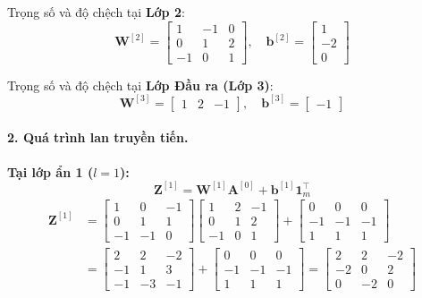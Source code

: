 Trọng số và độ chệch tại \textbf{Lớp 2}:
\begin{equation}
\mathbf{W}^{[2]} = 
\begin{bmatrix}
    1 & -1 & 0 \\
    0 & 1 & 2 \\
    -1 & 0 & 1
\end{bmatrix}, 
\quad
\mathbf{b}^{[2]} = 
\begin{bmatrix}
    1 \\ -2 \\ 0
\end{bmatrix}
\end{equation}

Trọng số và độ chệch tại \textbf{Lớp Đầu ra (Lớp 3)}:
\begin{equation}
\mathbf{W}^{[3]} = 
\begin{bmatrix}
    1 & 2 & -1
\end{bmatrix},
\quad
\mathbf{b}^{[3]} = 
\begin{bmatrix}
    -1
\end{bmatrix}
\end{equation}

\paragraph{2. Quá trình lan truyền tiến.\\}
\textbf{Tại lớp ẩn 1 ($l=1$):}
\begin{equation}
\mathbf{Z}^{[1]} = \mathbf{W}^{[1]}\mathbf{A}^{[0]} + \mathbf{b}^{[1]}\mathbf{1}_m^{\top}
\end{equation}
\begin{align*}
\mathbf{Z}^{[1]} 
&= 
\begin{bmatrix}
    1 & 0 & -1 \\
    0 & 1 & 1 \\
    -1 & -1 & 0
\end{bmatrix}
\begin{bmatrix}
    1 & 2 & -1 \\
    0 & 1 & 2 \\
    -1 & 0 & 1
\end{bmatrix}
+
\begin{bmatrix}
    0 & 0 & 0 \\
    -1 & -1 & -1 \\
    1 & 1 & 1
\end{bmatrix} \\
&= 
\begin{bmatrix}
    2 & 2 & -2 \\
    -1 & 1 & 3 \\
    -1 & -3 & -1
\end{bmatrix}
+
\begin{bmatrix}
    0 & 0 & 0 \\
    -1 & -1 & -1 \\
    1 & 1 & 1
\end{bmatrix}
=
\begin{bmatrix}
    2 & 2 & -2 \\
    -2 & 0 & 2 \\
    0 & -2 & 0
\end{bmatrix}
\end{align*}

